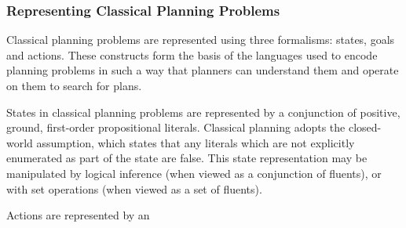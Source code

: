 \subsubsection{Representing Classical Planning Problems}

Classical planning problems are represented using three formalisms: states, goals and actions. These constructs form the basis of the languages used to encode planning problems in such a way that planners can understand them and operate on them to search for plans. 

States in classical planning problems are represented by a conjunction of positive, ground, first-order propositional literals. Classical planning adopts the closed-world assumption, which states that any literals which are not explicitly enumerated as part of the state are false. This state representation may be manipulated by logical inference (when viewed as a conjunction of fluents), or with set operations (when viewed as a set of fluents).

% 

Actions are represented by an 
